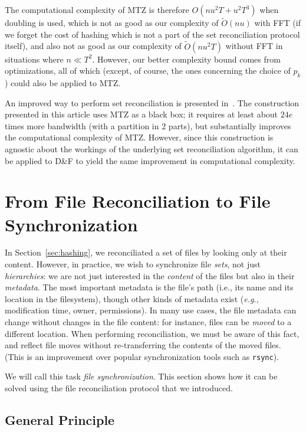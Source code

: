 \documentclass[twoside,envcountsame,runningheads]{llncs}
\newcommand{\Oapp}{\ensuremath{\tilde{O}}}
\newcommand{\df}{D\&F\xspace}
\newcommand{\rsync}{\texttt{rsync}\xspace}
\newcommand{\eg}{\textit{e.g.}\xspace}
\begin{document}
The computational complexity of MTZ is therefore $O(n u^2 T + u^2 T^3)$ when doubling is used, which is not as good as
our complexity of $\Oapp(n u)$ with FFT (if we forget the cost of hashing which is not a part of the set reconciliation protocol itself), and also not as good as our complexity of $\Oapp(n u^2 T)$ without FFT in situations where $n \ll T^2$. However, our better complexity bound comes from
optimizations, all of which (except, of course, the ones%
concerning the choice of $p_k$) could also be applied to MTZ.

An improved way to perform set reconciliation is presented in~\cite{PSRec}. The
construction presented in this article uses MTZ as a black box; it requires at least about $24e$ times more bandwidth (with a partition in $2$ parts), but substantially improves the computational complexity of MTZ. However, since this construction is agnostic about the workings of the underlying set reconciliation algorithm, it can be applied to \df to yield the same improvement in computational complexity.

\section{From File Reconciliation to File Synchronization}
\label{sec:files}

In Section~\ref{sec:hashing}, we reconciliated a set of files by looking only at their content.
However, in practice, we wish to synchronize file \emph{sets}, not just
\emph{hierarchies}: we are not just interested in the \emph{content} of the
files but also in their \emph{metadata}. The most important metadata is the file's
path (i.e., its name and its location in the filesystem), though other kinds of
metadata exist (\eg, modification time, owner, permissions). In many use
cases, the file metadata can change without changes in the file content: for
instance, files can be \emph{moved} to a different location. When performing
reconciliation, we must be aware of this fact, and reflect file moves without
re-transferring the contents of the moved files. (This is an improvement over
popular synchronization tools such as \rsync).

We will call this task \emph{file synchronization}. This section shows how it can be solved using the file reconciliation protocol that we introduced.

\subsection{General Principle}
\end{document}
